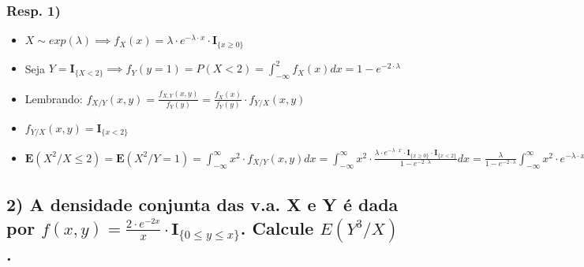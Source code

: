 \documentclass[portuguese]{article}
\begin{document}
\subsubsection*{\textmd{Resp}. \textmd{1)}}
\begin{itemize}
\item $X\sim exp(\lambda)\implies f_{X}(x)=\lambda\cdot e^{-\lambda\cdot x}\cdot\mathbf{I}_{\{x\geq0\}}$
\item Seja $Y=\mathbf{I}_{\{X<2\}}\implies f_{Y}(y=1)=P(X<2)=\int_{-\infty}^{2}f_{X}(x)dx=1-e^{-2\cdot\lambda}$
\item Lembrando: $f_{X/Y}(x,y)=\frac{f_{X,Y}(x,y)}{f_{Y}(y)}=\frac{f_{X}(x)}{f_{Y}(y)}\cdot f_{Y/X}(x,y)$
\item $f_{Y/X}(x,y)=\mathbf{I}_{\{x<2\}}$
\item $\mathbf{E}(X^{2}/X\leq2)=\mathbf{E}(X^{2}/Y=1)=\int_{-\infty}^{\infty}x^{2}\cdot f_{X/Y}(x,y)dx=\int_{-\infty}^{\infty}x^{2}\cdot\frac{\lambda\cdot e^{-\lambda\cdot x}\cdot\mathbf{I}_{\{x\geq0\}}\cdot\mathbf{I}_{\{x<2\}}}{1-e^{-2\cdot\lambda}}dx=\frac{\lambda}{1-e^{-2\cdot\lambda}}\int_{-\infty}^{\infty}x^{2}\cdot e^{-\lambda\cdot x}\cdot\mathbf{I}_{\{x\geq0\}}\cdot\mathbf{I}_{\{x<2\}}dx=\frac{\lambda}{1-e^{-2\cdot\lambda}}(-x^{2}\cdot\frac{e^{-\lambda\cdot x}}{\lambda^{2}}|_{x=0}^{x=2}+2\int_{0}^{2}x\cdot e^{-\lambda\cdot x}dx)=\frac{\lambda}{1-e^{-2\cdot\lambda}}\cdot(-4\cdot\frac{e^{-4\cdot\lambda}}{\lambda}+2(-x\cdot\frac{e^{-\lambda\cdot x}}{\lambda^{2}}|_{x=0}^{x=2}+\int_{0}^{2}\frac{e^{-\lambda\cdot x}}{\lambda^{2}}dx))=\frac{\lambda}{1-e^{-2\cdot\lambda}}\cdot(-4\cdot\frac{e^{-4\cdot\lambda}}{\lambda}-4\cdot\frac{e^{-2\cdot\lambda}}{\lambda^{2}}-2\cdot\frac{e^{-2\cdot\lambda}}{\lambda^{3}}+\frac{2}{\lambda^{3}})$
\end{itemize}

\subsection*{\textcompwordmark{}}


\subsection*{\textmd{2) A densidade conjunta das v.a. X e Y é dada por $f(x,y)=\frac{2\cdot e^{-2x}}{x}\cdot\mathbf{I}_{\{0\leq y\leq x\}}$.
Calcule $E(Y^{3}/X)$.}}
\end{document}
